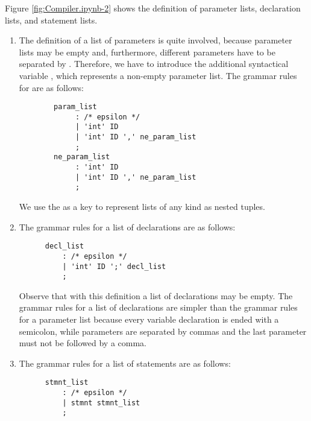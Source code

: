 Figure \ref{fig:Compiler.ipynb-2} shows the definition of parameter lists, declaration lists, and statement lists.
\begin{enumerate}
\item The definition of a list of parameters is quite involved, because parameter lists may be empty and,
      furthermore, different parameters have to be separated by \squoted{,}.  Therefore, we have to introduce 
      the additional syntactical variable , which represents a non-empty parameter
      list.  The grammar rules for  are as follows:
      \pagebreak
      
      \begin{verbatim}
        param_list 
             : /* epsilon */
             | 'int' ID
             | 'int' ID ',' ne_param_list
             ;
        ne_param_list 
             : 'int' ID
             | 'int' ID ',' ne_param_list
             ;
      \end{verbatim}
      We use the  as a key to represent lists of any kind as nested tuples.
\item The grammar rules for a list of declarations are as follows:
      \begin{verbatim}
      decl_list
          : /* epsilon */
          | 'int' ID ';' decl_list
          ;
      \end{verbatim}
      Observe that with this definition a list of declarations may be empty.
      The grammar rules for a list of declarations are simpler than the grammar rules for a parameter list
      because every variable declaration is ended with a semicolon, while parameters are separated by commas
      and the last parameter must not be followed by a comma.
\item The grammar rules for a list of statements are as follows:
      \begin{verbatim}
      stmnt_list
          : /* epsilon */
          | stmnt stmnt_list
          ;
      \end{verbatim}
\end{enumerate}
